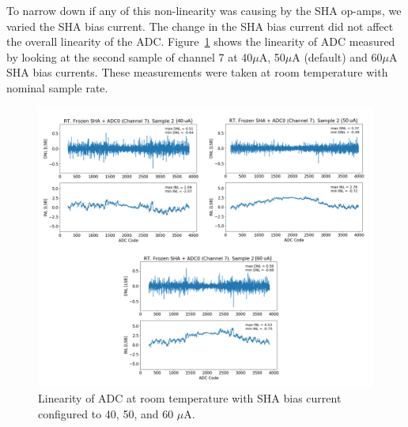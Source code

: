 To narrow down if any of this non-linearity was causing by the SHA op-amps, we varied the SHA bias current. The change in the SHA bias current did not affect the overall linearity of the ADC.
Figure~\ref{fig:linearity_sha_current} shows the linearity of ADC measured by looking at the second sample of channel 7 at 40$\mu$A, 50$\mu$A (default) and 60$\mu$A SHA bias currents. These measurements were taken at room temperature with nominal sample rate. 
\begin{figure}[h!]
\centering
  \includegraphics[width=1.0\linewidth]{figures/prakash_fig/linearity_sha_current.png}
  \caption{Linearity of ADC at room temperature with SHA bias current configured to 40, 50, and 60 $\mu$A.}
  \label{fig:linearity_sha_current}
\end{figure}

